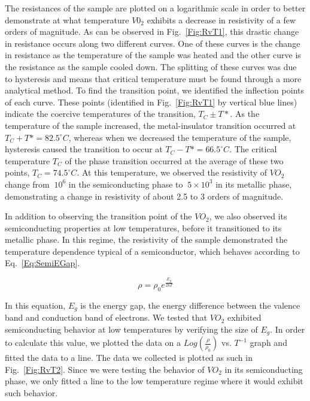 \documentclass[%
 reprint,
 amsmath,amssymb,
 aps,
 pra,
]{revtex4-1}
\begin{document}
The resistances of the sample are plotted on a logarithmic scale in order to better demonstrate at what temperature $V0_{2}$ exhibits a decrease in resistivity of a few orders of magnitude. As can be observed in Fig.~\ref{Fig:RvT1}, this drastic change in resistance occurs along two different curves. One of these curves is the change in resistance as the temperature of the sample was heated and the other curve is the resistance as the sample cooled down. The splitting of these curves was due to hysteresis and means that critical temperature must be found through a more analytical method. To find the transition point, we identified the inflection points of each curve. These points (identified in Fig.~\ref{Fig:RvT1} by vertical blue lines) indicate the coercive temperatures of the transition, $T_{C} \pm T*$. As the temperature of the sample increased, the metal-insulator transition occurred at $T_{C} + T* = 82.5 ^\circ C$, whereas when we decreased the temperature of the sample, hysteresis caused the transition to occur at $T_{C} - T* = 66.5 ^\circ C$. The critical temperature $T_{C}$ of the phase transition occurred at the average of these two points, $T_{C} = 74.5^\circ C$. At this temperature, we observed the resistivity of $VO_{2}$ change from $~10^{6}$ in the semiconducting phase to $~5 \times 10^3$ in its metallic phase, demonstrating a change in resistivity of about 2.5 to 3 orders of magnitude.

In addition to observing the transition point of the $VO_{2}$, we also observed its semiconducting properties at low temperatures, before it transitioned to its metallic phase. In this regime, the resistivity of the sample demonstrated the temperature dependence typical of a semiconductor, which behaves according to Eq.~\ref{Eq:SemiEGap}.

\begin{equation}\label{Eq:SemiEGap}
\rho = \rho_{0} e^{\frac{E_{g}}{2kT}}
\end{equation}

\noindent In this equation, $E_{g}$ is the energy gap, the energy difference between the valence band and conduction band of electrons. We tested that $VO_{2}$ exhibited semiconducting behavior at low temperatures by verifying the size of $E_{g}$. In order to calculate this value, we plotted the data on a $Log(\frac{\rho}{\rho_{0}})$ vs. $T^{-1}$ graph and fitted the data to a line. The data we collected is plotted as such in Fig.~\ref{Fig:RvT2}. Since we were testing the behavior of $VO_{2}$ in its semiconducting phase, we only fitted a line to the low temperature regime where it would exhibit such behavior.
\end{document}
